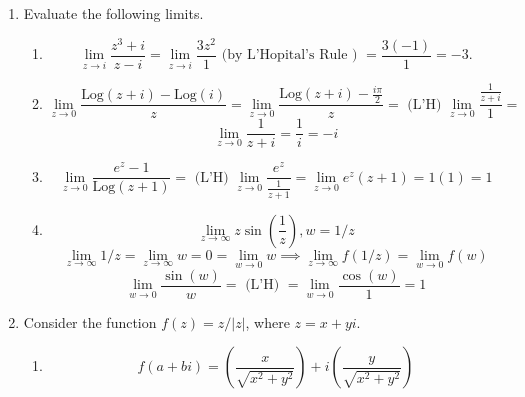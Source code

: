 \documentclass{article}
\newcommand{\Log}{\text{Log}}
\begin{document}
\begin{enumerate}

	\item Evaluate the following limits.
	\begin{enumerate}
		\item 
		\[\lim_{z\to i}\frac{z^3+i}{z-i} =  \lim_{z\to i}\frac{3z^2}{1}\text{ (by L'Hopital's Rule ) }=\frac{3(-1)}{1}=-3.\]
		\item 
		\[\lim_{z\to 0}\frac{\Log(z+i)-\Log(i)}{z} =  \lim_{z\to 0}\frac{\Log(z+i)-\frac{i\pi}{2}}{z} = \text{ (L'H) }\lim_{z\to 0}\frac{\frac{1}{z+i}}{1}= \]
		\[\lim_{z\to 0}\frac{1}{z+i}=\frac{1}{i}=-i \]
		\item 
		\[\lim_{z\to 0}\frac{e^z-1}{\Log(z+1)}=\text{ (L'H) } \lim_{z\to 0}\frac{e^z}{\frac{1}{z+1}} =\lim_{z\to 0}e^z(z+1)=1(1)=1 \]
		
		
		\item 
		\[ \lim_{z\to\infty}z\sin\left(\frac{1}{z}\right), w=1/z \]
		\[\lim_{z\to\infty}1/z = \lim_{z\to\infty}w=0=\lim_{w\to 0}w \implies \lim_{z\to\infty}f(1/z)=\lim_{w\to 0}f(w)\]
		\[\lim_{w\to 0}\frac{\sin(w)}{w}=\text{ (L'H) } =\lim_{w\to 0}\frac{\cos(w)}{1}=1\]
	\end{enumerate}
	
	\item Consider the function $f(z)=z/|z|$, where $z=x+yi$. 
	\begin{enumerate}
	
		\item 
		\[f(a+bi)=\left(\frac{x}{\sqrt{x^2+y^2}}\right)+i\left(\frac{y}{\sqrt{x^2+y^2}}\right)\]
		

\end{enumerate}
\end{enumerate}
\end{document}
